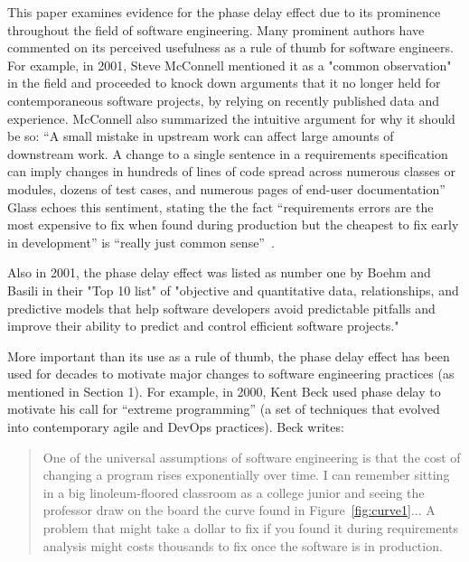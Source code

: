 \documentclass{sig-alternate}
\newcommand{\fig}[1]{Figure~\ref{fig:#1}}
\begin{document}
This paper examines evidence for the phase delay effect due to its prominence throughout the field of software engineering. Many prominent authors have commented on its perceived usefulness as a rule of thumb for software engineers. For example, in 2001, Steve McConnell mentioned it as a "common observation" in the field and proceeded to knock down arguments that it no longer held for contemporaneous software projects, by relying on recently published data and experience. McConnell also summarized the intuitive argument for why it should be so: ``A small mistake in upstream work can affect large amounts of downstream work. A change to a single sentence in a requirements specification can imply changes in hundreds of lines of code spread across numerous classes or modules, dozens of test cases, and numerous pages of end-user documentation''~\cite{mcconnell01} Glass echoes this sentiment, stating the the fact ``requirements errors are the most expensive to fix when found during production but the cheapest to fix early in development'' is ``really just common sense''~\cite{glass02}. 

Also in 2001, the phase delay effect was listed as number one by Boehm and Basili in their "Top 10 list" of "objective and quantitative data, relationships,
and predictive models that help
software developers avoid predictable pitfalls
and improve their ability to predict
and control efficient software projects." \cite{boehm01}

More important than its use as a rule of thumb, the phase delay effect has 
been used for decades to motivate major changes to software engineering practices (as mentioned in Section 1). For example,
in 2000, Kent Beck used phase delay to motivate his call for ``extreme programming'' (a set of techniques
that evolved into contemporary agile and DevOps practices). Beck writes:
\begin{quote}
One of the universal assumptions of software engineering is that the cost of changing a program rises exponentially over time. I can remember sitting in a big linoleum-floored classroom as a college junior and seeing the professor draw on the board the curve found in \fig{curve1}... 
%
A problem that might take a dollar to fix if you found it during requirements analysis might costs thousands to fix once the software is in production.
%
\cite{beck00}
\end{quote}
\end{document}
